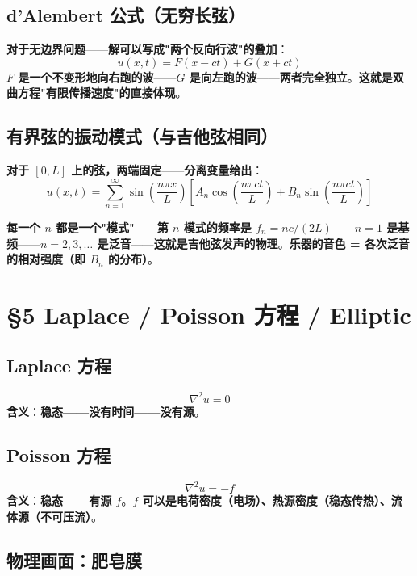 \subsection{d'Alembert 公式（无穷长弦）}

\textbf{对于无边界问题}——\textbf{解可以写成"两个反向行波"的叠加}：
\begin{equation}
u(x, t) = F(x - ct) + G(x + ct)
\end{equation}
\textbf{$F$ 是一个不变形地向右跑的波}——\textbf{$G$ 是向左跑的波}——\textbf{两者完全独立}。\textbf{这就是双曲方程"有限传播速度"的直接体现}。

\subsection{有界弦的振动模式（与吉他弦相同）}

\textbf{对于 $[0, L]$ 上的弦，两端固定}——\textbf{分离变量给出}：
\begin{equation}
u(x, t) = \sum_{n=1}^{\infty} \sin\!\left(\frac{n\pi x}{L}\right) \left[ A_n \cos\!\left(\frac{n\pi c t}{L}\right) + B_n \sin\!\left(\frac{n\pi c t}{L}\right) \right]
\end{equation}

\textbf{每一个 $n$ 都是一个"模式"}——\textbf{第 $n$ 模式的频率是 $f_n = nc/(2L)$}——\textbf{$n=1$ 是基频}——\textbf{$n=2, 3, \dots$ 是\textbf{泛音}}——\textbf{这就是吉他弦发声的物理}。\textbf{乐器的音色 = 各次泛音的相对强度（即 $B_n$ 的分布）}。

\section{§5 Laplace / Poisson 方程 / Elliptic}

\subsection{Laplace 方程}
\[
\nabla^2 u = 0
\]
\textbf{含义}：\textbf{稳态——没有时间——没有源}。

\subsection{Poisson 方程}
\[
\nabla^2 u = -f
\]
\textbf{含义}：\textbf{稳态——有源 $f$}。\textbf{$f$ 可以是电荷密度（电场）、热源密度（稳态传热）、流体源（不可压流）}。

\subsection{物理画面：肥皂膜}

